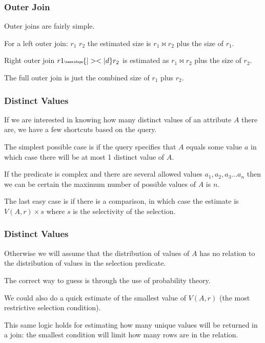 \begin{frame}
\frametitle{Outer Join}

Outer joins are fairly simple. 

For a left outer join: $r_{1}$ {\tiny {}} $r_{2}$ the estimated size is $r_{1} \bowtie r_{2}$ plus the size of $r_{1}$.

Right outer join $r{1} {\tiny \textifsym{|><|d}} r_{2}$ is estimated as $r_{1} \bowtie r_{2}$ plus the size of $r_{2}$. 

The full outer join {\tiny {}} is just the combined size of $r_{1}$ plus $r_{2}$.


\end{frame}

\begin{frame}
\frametitle{Distinct Values}

If we are interested in knowing how many distinct values of an attribute $A$ there are, we have a few shortcuts based on the query. 

The simplest possible case is if the query specifies that $A$ equals some value $a$ in which case there will be at most 1 distinct value of $A$. 

If the predicate is complex and there are several allowed values $a_{1}, a_{2}, a_{3}... a_{n}$ then we can be certain the maximum number of possible values of $A$ is $n$. 

The last easy case is if there is a comparison, in which case the estimate is $V(A,r) \times s$ where $s$ is the selectivity of the selection.


\end{frame}


\begin{frame}
\frametitle{Distinct Values}

Otherwise we will assume that the distribution of values of $A$ has no relation to the distribution of values in the selection predicate. 

The correct way to guess is through the use of probability theory. 

We could also do a quick estimate of the smallest value of $V(A, r)$ (the most restrictive selection condition). 

This same logic holds for estimating how many unique values will be returned in a join: the smallest condition will limit how many rows are in the relation.

\end{frame}


